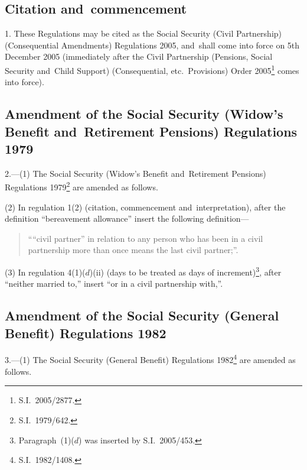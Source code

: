 \documentclass[12pt,a4paper]{article}
\begin{document}
{\sloppy

\tableofcontents

}

\bigskip

\setcounter{secnumdepth}{-2}

\subsection[1. Citation and~commencement]{Citation and~commencement}

1.  These Regulations may be cited as the Social Security (Civil Partnership) (Consequential Amendments) Regulations 2005, and~shall come into force on 5th December 2005 (immediately after the Civil Partnership (Pensions, Social Security and~Child Support) (Consequential, etc.\ Provisions) Order 2005\footnote{S.I.~2005/2877.} comes into force).

\subsection[2. Amendment of the Social Security (Widow’s Benefit and~Retirement Pensions) Regulations 1979]{Amendment of the Social Security (Widow’s Benefit and~Retirement Pensions) Regulations 1979}

2.---(1)  The Social Security (Widow’s Benefit and~Retirement Pensions) Regulations 1979\footnote{S.I.~1979/642.} are amended as follows.

(2) In regulation 1(2) (citation, commencement and~interpretation), after the definition “bereavement allowance” insert the following definition—
\begin{quotation}
““civil partner” in relation to any person who has been in a civil partnership more than once means the last civil partner;”.
\end{quotation}

(3) In regulation 4(1)($d$)(ii) (days to be treated as days of increment)\footnote{Paragraph~(1)($d$) was inserted by S.I.~2005/453.}, after “neither married to,” insert “or in a civil partnership with,”.

\subsection[3. Amendment of the Social Security (General Benefit) Regulations 1982]{Amendment of the Social Security (General Benefit) Regulations 1982}

3.---(1)  The Social Security (General Benefit) Regulations 1982\footnote{S.I.~1982/1408.} are amended as follows.
\end{document}
